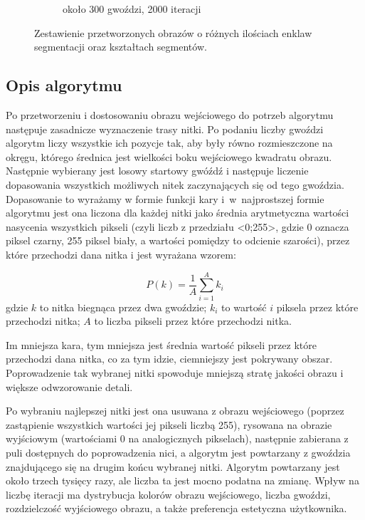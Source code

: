 \begin{figure}[htb]
\begin{subfigure}{0.23\textwidth}
            \caption{około 300 gwoździ, 2000 iteracji}
            \label{theory-segments-thread-d}
        \end{subfigure}
        \caption{Zestawienie przetworzonych obrazów o różnych ilościach enklaw segmentacji oraz kształtach segmentów.}
        \label{theory-segments-thread}
        \end{figure}
        
        \subsection{Opis algorytmu} \label{theory-std-method-algorithm}
        Po przetworzeniu i dostosowaniu obrazu wejściowego do potrzeb algorytmu następuje zasadnicze wyznaczenie trasy nitki. Po podaniu liczby gwoździ algorytm liczy wszystkie ich pozycje tak, aby były równo rozmieszczone na okręgu, którego średnica jest wielkości boku wejściowego kwadratu obrazu. Następnie wybierany jest losowy startowy gwóźdź i następuje liczenie dopasowania wszystkich możliwych nitek zaczynających się od tego gwoździa. Dopasowanie to wyrażamy w formie funkcji kary i~w~najprostszej formie algorytmu jest ona liczona dla każdej nitki jako średnia arytmetyczna wartości nasycenia wszystkich pikseli (czyli liczb z przedziału <0;255>, gdzie 0 oznacza piksel czarny, 255 piksel biały, a wartości pomiędzy to odcienie szarości), przez które przechodzi dana nitka i jest wyrażana wzorem:
        
        \begin{equation} \label{theory-std-method-penalty}
            P(k) = \frac{1}{A} \sum_{i=1}^A k_i
        \end{equation}
        gdzie \(k\) to nitka biegnąca przez dwa gwoździe; \(k_i\) to wartość \(i\) piksela przez które przechodzi nitka; \(A\) to liczba pikseli przez które przechodzi nitka.
        
        Im mniejsza kara, tym mniejsza jest średnia wartość pikseli przez które przechodzi dana nitka, co za tym idzie, ciemniejszy jest pokrywany obszar. Poprowadzenie tak wybranej nitki spowoduje mniejszą stratę jakości obrazu i większe odwzorowanie detali.
        
        Po wybraniu najlepszej nitki jest ona usuwana z obrazu wejściowego (poprzez zastąpienie wszystkich wartości jej pikseli liczbą 255), rysowana na obrazie wyjściowym (wartościami 0 na analogicznych pikselach), następnie zabierana z puli dostępnych do poprowadzenia nici, a algorytm jest powtarzany z gwoździa znajdującego się na drugim końcu wybranej nitki. Algorytm powtarzany jest około trzech tysięcy razy, ale liczba ta jest mocno podatna na zmianę. Wpływ na liczbę iteracji ma dystrybucja kolorów obrazu wejściowego, liczba gwoździ, rozdzielczość wyjściowego obrazu, a także preferencja estetyczna użytkownika.
        
